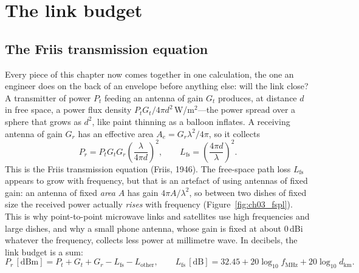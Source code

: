 \section{The link budget}
\label{sec:ch03:linkbudget}

\subsection{The Friis transmission equation}


Every piece of this chapter now comes together in one calculation, the one an engineer does on the back of
an envelope before anything else: will the link close? A transmitter of power $P_t$ feeding an antenna of
gain $G_t$ produces, at distance $d$ in free space, a power flux density $P_tG_t/4\pi d^2$\,W/m$^2$---the
power spread over a sphere that grows as $d^2$, like paint thinning as a balloon inflates. A receiving
antenna of gain $G_r$ has an effective area $A_e=G_r\lambda^2/4\pi$, so it collects
\begin{equation}
P_r=P_tG_tG_r\left(\frac{\lambda}{4\pi d}\right)^2,
\qquad
L_{\text{fs}}=\left(\frac{4\pi d}{\lambda}\right)^2 .
\label{eq:ch03:friistx}
\end{equation}
This is the Friis transmission equation (Friis, 1946). The free-space path loss $L_{\text{fs}}$ appears to
grow with frequency, but that is an artefact of using antennas of fixed gain: an antenna of fixed
\emph{area} $A$ has gain $4\pi A/\lambda^2$, so between two dishes of fixed size the received power actually
\emph{rises} with frequency (Figure~\ref{fig:ch03_fspl}). This is why point-to-point microwave links and
satellites use high frequencies and large dishes, and why a small phone antenna, whose gain is fixed at
about 0\,dBi whatever the frequency, collects less power at millimetre wave. In decibels, the link budget
is a sum:
\begin{equation}
P_r\,[\mathrm{dBm}]=P_t+G_t+G_r-L_{\text{fs}}-L_{\text{other}},\qquad
L_{\text{fs}}\,[\mathrm{dB}]=32.45+20\log_{10}f_{\mathrm{MHz}}+20\log_{10}d_{\mathrm{km}}.
\label{eq:ch03:fspl}
\end{equation}

